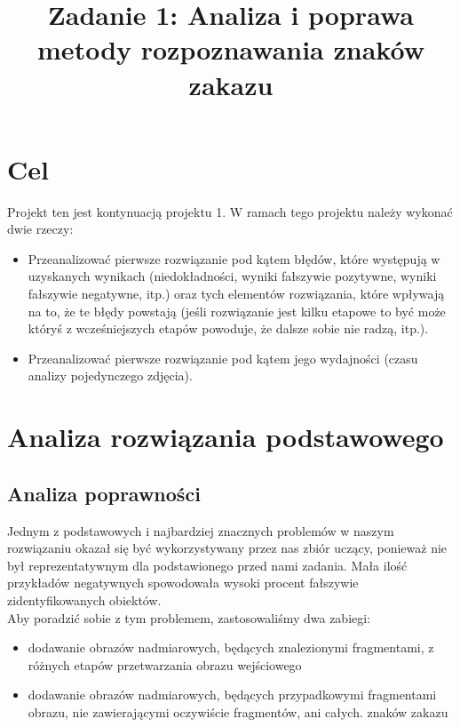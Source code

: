 \documentclass{classrep}
\author{
  \studentinfo{Paweł Musiał}{178726} \and
  \studentinfo{Łukasz Michalski}{178724}
}
\title{Zadanie 1: Analiza i poprawa metody rozpoznawania znaków zakazu}
\begin{document}
\maketitle



\section{Cel}
Projekt ten jest kontynuacją projektu 1. W ramach tego projektu należy wykonać dwie rzeczy:
\begin{itemize}


\item    Przeanalizować pierwsze rozwiązanie pod kątem błędów, które występują w uzyskanych wynikach (niedokładności, wyniki fałszywie pozytywne, wyniki fałszywie negatywne, itp.) oraz tych elementów rozwiązania, które wpływają na to, że te błędy powstają (jeśli rozwiązanie jest kilku etapowe to być może któryś z wcześniejszych etapów powoduje, że dalsze sobie nie radzą, itp.).
\item    Przeanalizować pierwsze rozwiązanie pod kątem jego wydajności (czasu analizy pojedynczego zdjęcia).
    \end{itemize}


\section{Analiza rozwiązania podstawowego}

\subsection{Analiza poprawności}


Jednym z podstawowych i najbardziej znacznych problemów w naszym rozwiązaniu okazał się być wykorzystywany przez nas zbiór uczący, ponieważ nie był reprezentatywnym dla podstawionego przed nami zadania. Mała ilość przykładów negatywnych spowodowała wysoki procent fałszywie zidentyfikowanych obiektów.\\
Aby poradzić sobie z tym problemem, zastosowaliśmy dwa zabiegi:
\begin{itemize}
\item dodawanie obrazów nadmiarowych, będących znalezionymi fragmentami, z różnych etapów przetwarzania obrazu wejściowego\\
\item dodawanie obrazów nadmiarowych, będących przypadkowymi fragmentami obrazu, nie zawierającymi oczywiście fragmentów, ani całych. znaków zakazu\\

\end{itemize}
\\
\end{document}
